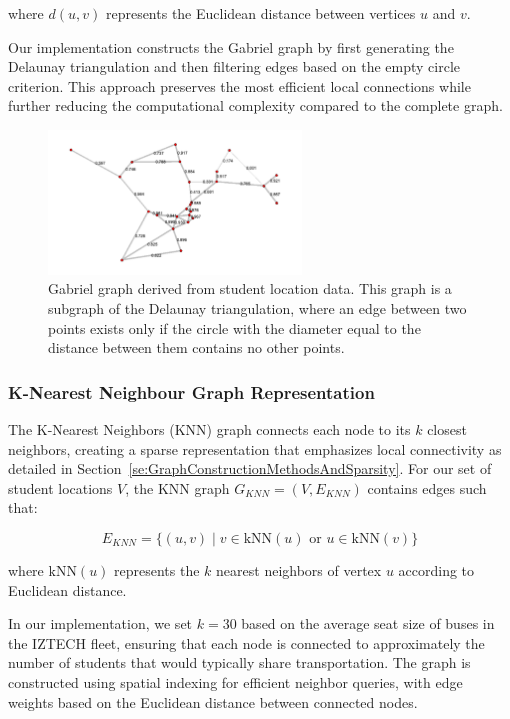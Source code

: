 where $d(u, v)$ represents the Euclidean distance between vertices $u$ and $v$.

Our implementation constructs the Gabriel graph by first generating the Delaunay triangulation and then filtering edges based on the empty circle criterion. This approach preserves the most efficient local connections while further reducing the computational complexity compared to the complete graph.

\begin{figure}[!htbp]
\centering
\includegraphics[width=0.6\textwidth]{img/gabriel}
\caption{Gabriel graph derived from student location data. This graph is a subgraph of the Delaunay triangulation, where an edge between two points exists only if the circle with the diameter equal to the distance between them contains no other points.}
\label{fig:gabriel_graph}
\end{figure}

\subsubsection{K-Nearest Neighbour Graph Representation}
\label{subsubsec:knn}

The K-Nearest Neighbors (KNN) graph connects each node to its $k$ closest neighbors, creating a sparse representation that emphasizes local connectivity as detailed in Section~\ref{se:GraphConstructionMethodsAndSparsity}. For our set of student locations $V$, the KNN graph $G_{KNN}=(V, E_{KNN})$ contains edges such that:

\begin{equation}
E_{KNN} = \{(u, v) \mid v \in \text{kNN}(u) \text{ or } u \in \text{kNN}(v)\}
\end{equation}

where $\text{kNN}(u)$ represents the $k$ nearest neighbors of vertex $u$ according to Euclidean distance.

In our implementation, we set $k=30$ based on the average seat size of buses in the IZTECH fleet, ensuring that each node is connected to approximately the number of students that would typically share transportation. The graph is constructed using spatial indexing for efficient neighbor queries, with edge weights based on the Euclidean distance between connected nodes.

